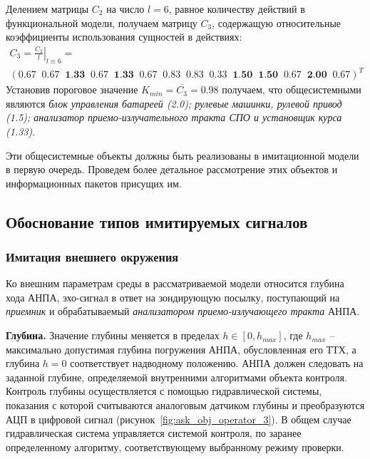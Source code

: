 Делением матрицы $C_2$ на число $l = 6$, равное количеству действий в функциональной модели, получаем матрицу $C_3$,
содержащую относительные коэффициенты использования сущностей в действиях:
\begin{multline*}
    C_3 = \left. \frac{C_2}{l} \right|_{l \equiv 6} = \\
        \left( 0.67\;\; 0.67\;\; \textbf{1.33}\;\; 0.67\;\; \textbf{1.33}\;\; 0.67\;\; 0.83\;\; 0.83\;\; 
        0.33\;\; \textbf{1.50}\;\;\textbf{1.50}\;\; 0.67\;\; \textbf{2.00}\;\; 0.67 \right)^T
\end{multline*}
Установив пороговое значение $K_{min} = \overline{C_3} = 0.98$ получаем, что общесистемными являются
\textit{блок управления батареей (2.0);
    рулевые машинки, рулевой привод (1.5);
    анализатор приемо-излучательного тракта СПО и установщик курса (1.33)}.

Эти общесистемные объекты должны быть реализованы в имитационной модели в первую очередь.
Проведем более детальное рассмотрение этих объектов и информационных пакетов присущих им.




\subsection{Обоснование типов имитируемых сигналов}\label{sec:model_anpa_params}

\subsubsection{Имитация внешнего окружения}\label{sec:model_anpa:outer_params}
Ко внешним параметрам среды в рассматриваемой модели относится
глубина хода АНПА, эхо-сигнал в ответ на зондирующую посылку,
поступающий на \textit{приемник} и обрабатываемый \textit{анализатором приемо-излучающего тракта} АНПА.

\textbf{Глубина.}
Значение глубины меняется в пределах $h \in [0, h_{max}]$,
где $h_{max}$ -- максимально допустимая глубина погружения АНПА, обусловленная его ТТХ,
а глубина $h = 0$ соответствует надводному положению.
АНПА должен следовать на заданной глубине, определяемой внутренними алгоритмами объекта контроля.
Контроль глубины осуществляется с помощью гидравлической системы,
показания с которой считываются аналоговым датчиком глубины и преобразуются АЦП в цифровой сигнал (рисунок~\ref{fig:ask_obj_operator_3}).
В общем случае гидравлическая система управляется системой контроля,
по заранее определенному алгоритму, соответствующему выбранному режиму проверки.

